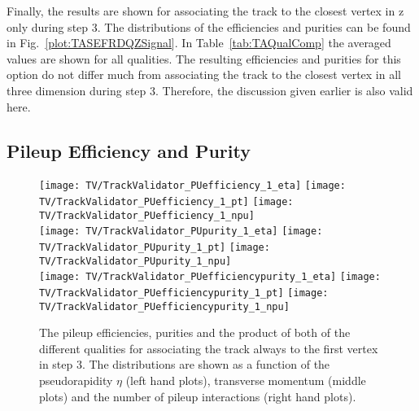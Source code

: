 Finally, the results are shown for associating the track to the closest vertex in z only during step 3. The distributions of the efficiencies and purities can be found in Fig.~\ref{plot:TASEFRDQZSignal}. In Table~\ref{tab:TAQualComp} the averaged values are shown for all qualities. The resulting efficiencies and purities for this option do not differ much from associating the track to the closest vertex in all three dimension during step 3. Therefore, the discussion given earlier is also valid here.


\clearpage{}

\subsection{Pileup Efficiency and Purity \label{sec:TAPUEFR}}

\begin{figure}[Ht]
    \centering
    \texttt{[image: TV/TrackValidator\_PUefficiency\_1\_eta]}
    \texttt{[image: TV/TrackValidator\_PUefficiency\_1\_pt]}
    \texttt{[image: TV/TrackValidator\_PUefficiency\_1\_npu]}
    \\
    \texttt{[image: TV/TrackValidator\_PUpurity\_1\_eta]}
    \texttt{[image: TV/TrackValidator\_PUpurity\_1\_pt]}
    \texttt{[image: TV/TrackValidator\_PUpurity\_1\_npu]}
    \\
    \texttt{[image: TV/TrackValidator\_PUefficiencypurity\_1\_eta]}
    \texttt{[image: TV/TrackValidator\_PUefficiencypurity\_1\_pt]}
    \texttt{[image: TV/TrackValidator\_PUefficiencypurity\_1\_npu]}
    \caption[Pileup efficiencies, purities and their product of the different qualities of the association map with associating the track always to the first vertex in step 3]{The pileup efficiencies, purities and the product of both of the different qualities for associating the track always to the first vertex in step 3. The distributions are shown as a function of the pseudorapidity $\eta$ (left hand plots), transverse momentum (middle plots) and the number of pileup interactions (right hand plots). \label{plot:TASEFRDQ1Pileup}}
\end{figure}

